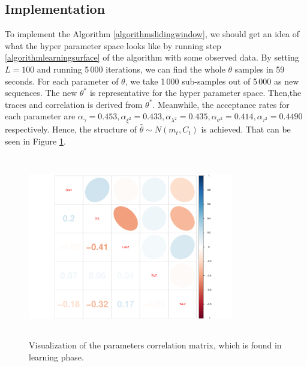 \subsection{Implementation}

To implement the Algorithm \ref{algorithmslidingwindow}, we should get an idea of what the hyper parameter space looks like by running step \ref{algorithmlearningsurface} of the algorithm with some observed data. By setting $L=100$ and running 5\,000 iterations, we can find the whole $\theta$ samples in 59 seconds. For each parameter of $\theta$, we take 1\,000 sub-samples out of 5\,000 as new sequences. The new $\theta^*$ is representative for the hyper parameter space. Then,the traces and correlation is derived from $\theta^*$. Meanwhile, the acceptance rates for each parameter are $\alpha_\gamma = 0.453,\alpha_{\xi^2}=0.433, \alpha_{\lambda^2}=0.435, \alpha_{\sigma^2}=0.414, \alpha_{\tau^2}=0.4490$ respectively. Hence, the structure of  $\hat{\theta}\sim N\left( m_t,C_t\right)$ is achieved. That can be seen in Figure \ref{realdatacorMatrix}. 
\begin{figure}[h]
\centering
\includegraphics[width=0.8\textwidth,height=8cm]{Chapters/05MCMCOU/plots/realdatalearningcorMatrix.pdf}
\caption{Visualization of the parameters correlation matrix, which is found in learning phase. }\label{realdatacorMatrix}
\end{figure}


